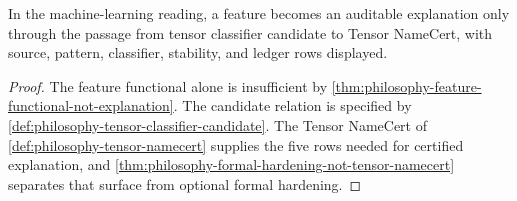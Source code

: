 \begin{theorem}
\label{thm:philosophy-tensor-namecert-theorem}
In the machine-learning reading, a feature becomes an auditable
explanation only through the passage from tensor classifier candidate to
Tensor NameCert, with source, pattern, classifier, stability, and ledger
rows displayed.
\end{theorem}
\begin{proof}
The feature functional alone is insufficient by
\autoref{thm:philosophy-feature-functional-not-explanation}. The
candidate relation is specified by
\autoref{def:philosophy-tensor-classifier-candidate}. The Tensor NameCert
of \autoref{def:philosophy-tensor-namecert} supplies the five rows needed
for certified explanation, and
\autoref{thm:philosophy-formal-hardening-not-tensor-namecert} separates
that surface from optional formal hardening.
\end{proof}

